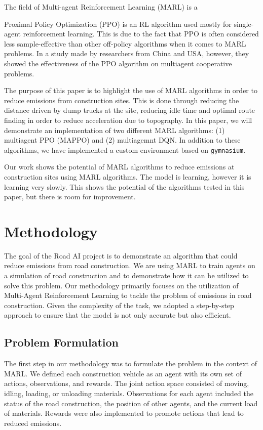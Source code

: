 \documentclass[conference]{IEEEtran}
\begin{document}
The field of Multi-agent Reinforcement Learning (MARL) is a 


Proximal Policy Optimization (PPO) is an RL algorithm used mostly for single-agent reinforcement learning.
This is due to the fact that PPO is often considered less sample-effective than other off-policy algorithms
when it comes to MARL problems. In a study made by researchers from China and USA, however, they showed the
effectiveness of the PPO algorithm on multiagent cooperative problems. \cite{yu2022surprising}


The purpose of this paper is to highlight the use of MARL algorithms in order to reduce \coo emissions
from construction sites. This is done through reducing the distance driven by dump trucks at the site,
reducing idle time and optimal route finding in order to reduce acceleration due to topography. In this
paper, we will demonstrate an implementation of two different MARL algorithms:
(1) multiagent PPO (MAPPO) and (2) multiagemnt DQN. In addition to these algorithms, we have implemented a
custom environment based on \texttt{gymnasium}. \cite{Towers_Gymnasium}

Our work shows the potential of MARL algorithms to reduce emissions at construction sites using MARL
algorithms. The model is learning, however it is learning very slowly. This shows the potential of
the algorithms tested in this paper, but there is room for improvement.


\section{Methodology}

The goal of the Road AI project is to demonstrate an algorithm that could reduce emissions from road construction.
We are using MARL to train agents on a simulation of road construction and to demonstrate how it can be utilized to solve this problem.
Our methodology primarily focuses on the utilization of Multi-Agent Reinforcement Learning to tackle the problem of emissions in road construction. Given the complexity of the task, we adopted a step-by-step approach to ensure that the model is not only accurate but also efficient.

\subsection{Problem Formulation}
The first step in our methodology was to formulate the problem in the context of MARL. We defined each construction vehicle as an agent with its own set of actions, observations, and rewards. The joint action space consisted of moving, idling, loading, or unloading materials. Observations for each agent included the status of the road construction, the position of other agents, and the current load of materials. Rewards were also implemented to promote actions that lead to reduced emissions.
\end{document}
